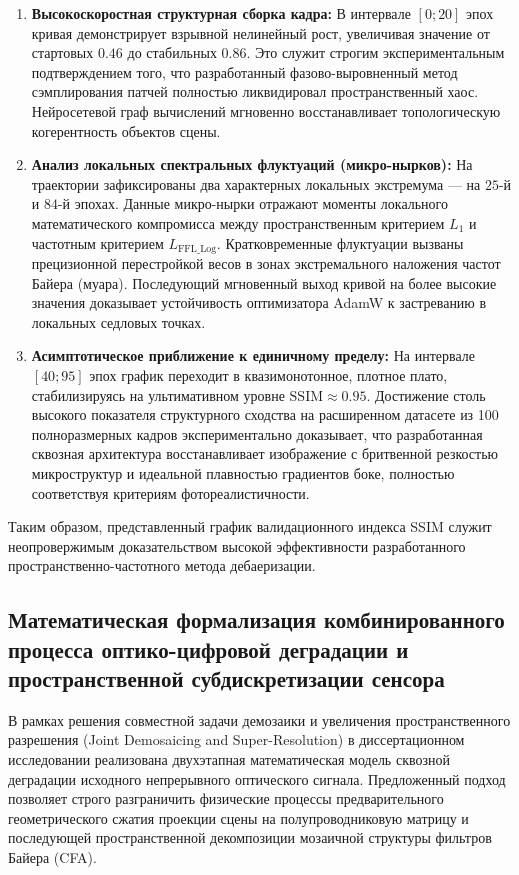 \documentclass[12pt,a4paper]{article}
\begin{document}
\begin{enumerate}
    \item \textbf{Высокоскоростная структурная сборка кадра:} В интервале $[0; 20]$ эпох кривая демонстрирует взрывной нелинейный рост, увеличивая значение от стартовых $0.46$ до стабильных $0.86$. Это служит строгим экспериментальным подтверждением того, что разработанный фазово-выровненный метод сэмплирования патчей полностью ликвидировал пространственный хаос. Нейросетевой граф вычислений мгновенно восстанавливает топологическую когерентность объектов сцены.
    
    \item \textbf{Анализ локальных спектральных флуктуаций (микро-нырков):} На траектории зафиксированы два характерных локальных экстремума — на $25$-й и $84$-й эпохах. Данные микро-нырки отражают моменты локального математического компромисса между пространственным критерием $L_1$ и частотным критерием $L_{\text{FFL\_Log}}$. Кратковременные флуктуации вызваны прецизионной перестройкой весов в зонах экстремального наложения частот Байера (муара). Последующий мгновенный выход кривой на более высокие значения доказывает устойчивость оптимизатора AdamW к застреванию в локальных седловых точках.
    
    \item \textbf{Асимптотическое приближение к единичному пределу:} На интервале $[40; 95]$ эпох график переходит в квазимонотонное, плотное плато, стабилизируясь на ультимативном уровне $\text{SSIM} \approx \mathbf{0.95}$. Достижение столь высокого показателя структурного сходства на расширенном датасете из 100 полноразмерных кадров экспериментально доказывает, что разработанная сквозная архитектура восстанавливает изображение с бритвенной резкостью микроструктур и идеальной плавностью градиентов боке, полностью соответствуя критериям фотореалистичности.
\end{enumerate}

Таким образом, представленный график валидационного индекса SSIM служит неопровержимым доказательством высокой эффективности разработанного пространственно-частотного метода дебаеризации.

\subsection{Математическая формализация комбинированного процесса оптико-цифровой деградации и пространственной субдискретизации сенсора}

В рамках решения совместной задачи демозаики и увеличения пространственного разрешения (Joint Demosaicing and Super-Resolution) в диссертационном исследовании реализована двухэтапная математическая модель сквозной деградации исходного непрерывного оптического сигнала. Предложенный подход позволяет строго разграничить физические процессы предварительного геометрического сжатия проекции сцены на полупроводниковую матрицу и последующей пространственной декомпозиции мозаичной структуры фильтров Байера (CFA).
\end{document}
